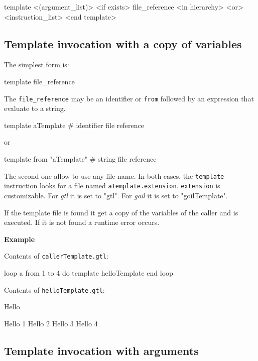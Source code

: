 \documentclass[10pt,openright,twosides,final]{memoir}
\newcommand{\gtltype}[1]{{\small\ttfamily #1}}
\newcommand{\tool}[1]{{\em #1}}
\newcommand{\scst}[1]{{\footnotesize\ttfamily\colorbox{light-blue}{"#1"}}}
\newcommand{\gtlinline}[1]{\colorbox{light-blue}{\lstinline[language=gtl]{#1}}}
\newcommand{\example}{\vspace{.75em}\noindent\textbf{Example}\vspace{0em}}
\begin{document}
\begin{gtl}
template <(argument_list)> <if exists> file_reference <in hierarchy>
<or>
  <instruction_list>
<end template> 
\end{gtl}

\subsection{Template invocation with a copy of variables}

The simplest form is:

\begin{gtl}
template file_reference
\end{gtl}

The \gtlinline{file_reference} may be an identifier or \gtlinline{from} followed by an expression that evaluate to a \gtltype{string}.

\begin{gtl}
template aTemplate # identifier file reference
\end{gtl}

\noindent or

\begin{gtl}
template from "aTemplate" # string file reference
\end{gtl}

The second one allow to use any file name. In both cases, the \gtlinline{template} instruction looks for a file named \gtlinline{aTemplate.extension}. \gtlinline{extension} is customizable. For \tool{gtl} it is set to \scst{gtl}. For \tool{goil} it is set to \scst{goilTemplate}.

If the template file is found it get a copy of the variables of the caller and is executed. If it is not found a runtime error occurs.

\example

\noindent Contents of \texttt{\small callerTemplate.gtl}:

\begin{gtl}
loop a from 1 to 4 do
  template helloTemplate 
end loop
%
%
\end{gtl}
\noindent Contents of \texttt{\small helloTemplate.gtl}:
\begin{gtl-tmode}
Hello
\end{gtl-tmode}
\begin{templateoutput}
Hello 1 Hello 2 Hello 3 Hello 4 
\end{templateoutput}

\subsection{Template invocation with arguments}
\label{sec:templatesArgs}
\end{document}

